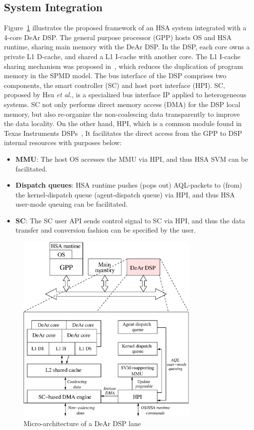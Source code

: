 \subsection{System Integration}
\label{sec:integration}
Figure~\ref{fig:archi} illustrates the proposed framework of an HSA system integrated with a 4-core DeAr DSP.
The general purpose processor (GPP) hosts OS and HSA runtime, sharing main memory with the DeAr DSP.
In the DSP, each core owns a private L1 D-cache, and shared a L1 I-cache with another core.
The L1 I-cache sharing mechanism was proposed in~\cite{kelly2004shared},
which reduces the duplication of program memory in the SPMD model.
The bus interface of the DSP comprises two components, the smart controller (SC) and host port interface (HPI).
SC, proposed by Hsu \textit{et al.}, is a specialized bus interface IP applied to heterogeneous systems.
SC not only performs direct memory access (DMA) for the DSP local memory,
but also re-organize the non-coalescing data transparently to improve the data locality.
On the other hand, HPI, which is a common module found in Texas Instruments DSPs~\cite{hpi},
It facilitates the direct access from the GPP to DSP internal resources with purposes below:
\begin{itemize}
    \item \textbf{MMU}: The host OS accesses the MMU via HPI, and thus HSA SVM can be facilitated.
    \item \textbf{Dispatch queues}: HSA runtime pushes (pops out) AQL-packets to (from) the kernel-dispatch queue (agent-dispatch queue) via HPI, 
        and thus HSA user-mode queuing can be facilitated.
    \item \textbf{SC}: The SC user API sends control signal to SC via HPI, 
        and thus the data transfer and conversion fashion can be specified by the user.
\end{itemize}

\vspace{\textfig}
\begin{figure}[!ht] 
    \centering
    \includegraphics[width=0.8\textwidth]{./figs/archi.eps}
    \caption{Micro-architecture of a DeAr DSP lane}
    \label{fig:archi}
\end{figure}


